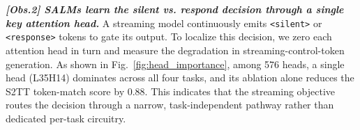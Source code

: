 \documentclass{article}
\begin{document}
\textit{\textbf{[Obs.2] SALMs learn the silent vs. respond decision through a single key attention head.}} A streaming model continuously emits \texttt{<silent>} or \texttt{<response>} tokens to gate its output. To localize this decision, we zero each attention head in turn and measure the degradation in streaming-control-token generation. As shown in Fig.~\ref{fig:head_importance}, among 576 heads, a single head (L35H14) dominates across all four tasks, and its ablation alone reduces the S2TT token-match score by 0.88. This indicates that the streaming objective routes the decision through a narrow, task-independent pathway rather than dedicated per-task circuitry.

\end{document}
